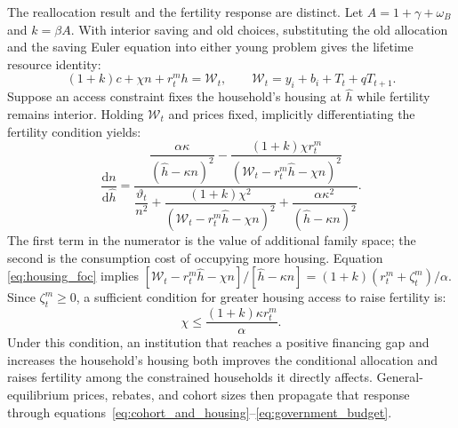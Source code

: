 \documentclass[10pt]{article}
\theoremstyle{definition}
\newcommand{\dd}{\mathrm d}
\begin{document}
The reallocation result and the fertility response are distinct. Let
$A=1+\gamma+\omega_B$ and $k=\beta A$. With interior saving and old choices,
substituting the old allocation and the saving Euler equation into either young
problem gives the lifetime resource identity:
\begin{equation}
 (1+k)c+\chi n+r_t^m h=\mathcal W_t,
 \qquad
 \mathcal W_t=y_i+b_i+T_t+qT_{t+1}.
 \label{eq:lifetime_budget}
\end{equation}
Suppose an access constraint fixes the household's housing at $\widehat h$ while
fertility remains interior. Holding $\mathcal W_t$ and prices fixed, implicitly
differentiating the fertility condition yields:
\begin{equation}
 \frac{\dd n}{\dd \widehat h}
 =\frac{
 \dfrac{\alpha\kappa}{(\widehat h-\kappa n)^2}
 -\dfrac{(1+k)\chi r_t^m}
 {(\mathcal W_t-r_t^m\widehat h-\chi n)^2}}
 {\dfrac{\vartheta_t}{n^2}
 +\dfrac{(1+k)\chi^2}
 {(\mathcal W_t-r_t^m\widehat h-\chi n)^2}
 +\dfrac{\alpha\kappa^2}{(\widehat h-\kappa n)^2}}.
 \label{eq:fertility_cap_derivative}
\end{equation}
The first term in the numerator is the value of additional family space; the
second is the consumption cost of occupying more housing. Equation
\eqref{eq:housing_foc} implies
$[\mathcal W_t-r_t^m\widehat h-\chi n]/[\widehat h-\kappa n]
=(1+k)(r_t^m+\zeta_t^m)/\alpha$. Since $\zeta_t^m\geq0$, a sufficient
condition for greater housing access to raise fertility is:
\begin{equation}
 \chi\leq\frac{(1+k)\kappa r_t^m}{\alpha}.
 \label{eq:fertility_sufficient_condition}
\end{equation}
Under this condition, an institution that reaches a positive financing gap and
increases the household's housing both improves the conditional allocation and
raises fertility among the constrained households it directly affects.
General-equilibrium prices, rebates, and cohort sizes then propagate that
response through
equations~\eqref{eq:cohort_and_housing}--\eqref{eq:government_budget}.
\end{document}
